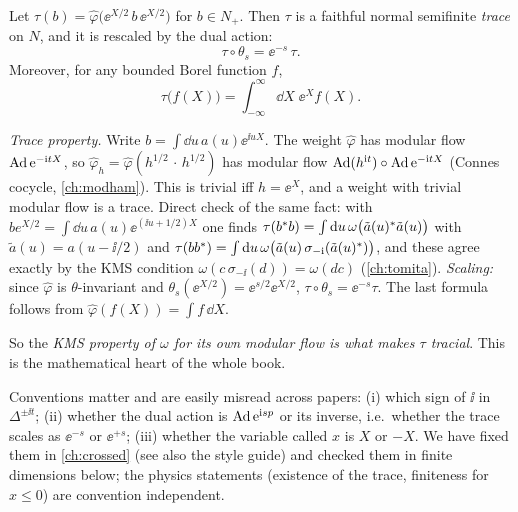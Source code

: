 \begin{theorem}\label{thm:trace}
Let $\tau(b)=\hat\varphi\big(\ee^{X/2}\,b\,\ee^{X/2}\big)$ for $b\in N_+$. Then $\tau$ is a faithful normal semifinite \emph{trace} on $N$, and it is rescaled by the dual action:
\begin{equation}
\tau\circ\theta_s=\ee^{-s}\,\tau.
\end{equation}
Moreover, for any bounded Borel function $f$,
\begin{equation}
\tau\big(f(X)\big)=\int_{-\infty}^\infty\dd X\;\ee^{X}f(X).
\end{equation}
\end{theorem}

\begin{proofsketch}
\emph{Trace property.} Write $b=\int\dd u\,a(u)\ee^{\ii uX}$. The weight $\hat\varphi$ has modular flow $\operatorname{Ad}\mathrm{e}^{-\mathrm{i} tX}$, so $\hat\varphi_h=\hat\varphi(h^{1/2}\,\cdot\,h^{1/2})$ has modular flow $\operatorname{Ad}(h^{\mathrm{i} t})\circ\operatorname{Ad}\mathrm{e}^{-\mathrm{i} tX}$ (Connes cocycle, \cref{ch:modham}). This is trivial iff $h=\ee^{X}$, and a weight with trivial modular flow is a trace. Direct check of the same fact: with $b e^{X/2}=\int\dd u\,a(u)\ee^{(\ii u+1/2)X}$ one finds $\tau(b^{*} b)=\int\mathrm{d} u\,\omega\big(\tilde a(u)^{*}\tilde a(u)\big)$ with $\tilde a(u)=a(u-\ii/2)$ and $\tau(bb^{*})=\int\mathrm{d} u\,\omega\big(\tilde a(u)\,\sigma_{-\mathrm{i}}(\tilde a(u)^{*})\big)$, and these agree exactly by the KMS condition $\omega(c\,\sigma_{-\ii}(d))=\omega(dc)$ (\cref{ch:tomita}). \emph{Scaling:} since $\hat\varphi$ is $\theta$-invariant and $\theta_s(\ee^{X/2})=\ee^{s/2}\ee^{X/2}$, $\tau\circ\theta_s=\ee^{-s}\tau$. The last formula follows from $\hat\varphi(f(X))=\int f\,\dd X$.
\end{proofsketch}

So the \emph{KMS property of $\omega$ for its own modular flow is what makes $\tau$ tracial}. This is the mathematical heart of the whole book.

\begin{whatwrong}
Conventions matter and are easily misread across papers: (i) which sign of $\ii$ in $\Delta^{\pm\ii t}$; (ii) whether the dual action is $\operatorname{Ad}\mathrm{e}^{\mathrm{i} sp}$ or its inverse, i.e.\ whether the trace scales as $\ee^{-s}$ or $\ee^{+s}$; (iii) whether the variable called $x$ is $X$ or $-X$. We have fixed them in \cref{ch:crossed} (see also the style guide) and checked them in finite dimensions below; the physics statements (existence of the trace, finiteness for $x\le0$) are convention independent.
\end{whatwrong}


